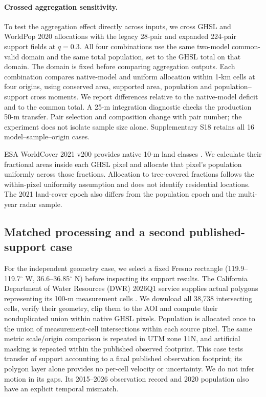 \documentclass[pdflatex,lineno,sn-nature]{sn-jnl}
\begin{document}
\paragraph{Crossed aggregation sensitivity.} To test the aggregation effect directly across inputs, we cross GHSL and WorldPop 2020 allocations with the legacy 28-pair and expanded 224-pair support fields at $q=0.3$. All four combinations use the same two-model common-valid domain and the same total population, set to the GHSL total on that domain. The domain is fixed before comparing aggregation outputs. Each combination compares native-model and uniform allocation within 1-km cells at four origins, using conserved area, supported area, population and population--support cross moments. We report differences relative to the native-model deficit and to the common total. A 25-m integration diagnostic checks the production 50-m transfer. Pair selection and composition change with pair number; the experiment does not isolate sample size alone. Supplementary S18 retains all 16 model--sample--origin cases.

ESA WorldCover 2021 v200 provides native 10-m land classes \citep{worldcover2021}. We calculate their fractional areas inside each GHSL pixel and allocate that pixel's population uniformly across those fractions. Allocation to tree-covered fractions follows the within-pixel uniformity assumption and does not identify residential locations. The 2021 land-cover epoch also differs from the population epoch and the multi-year radar sample.

\subsection{Matched processing and a second published-support case}


For the independent geometry case, we select a fixed Fresno rectangle (119.9--119.7$^\circ$ W, 36.6--36.85$^\circ$ N) before inspecting its support results. The California Department of Water Resources (DWR) 2026Q1 service supplies actual polygons representing its 100-m measurement cells \citep{dwr2026,dwrdocumentation}. We download all 38,738 intersecting cells, verify their geometry, clip them to the AOI and compute their nonduplicated union within native GHSL pixels. Population is allocated once to the union of measurement-cell intersections within each source pixel. The same metric scale/origin comparison is repeated in UTM zone 11N, and artificial masking is repeated within the published observed footprint. This case tests transfer of support accounting to a final published observation footprint; its polygon layer alone provides no per-cell velocity or uncertainty. We do not infer motion in its gaps. Its 2015--2026 observation record and 2020 population also have an explicit temporal mismatch.
\end{document}
